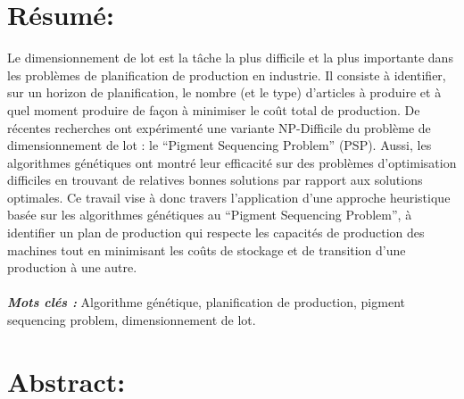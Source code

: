 \documentclass[12pt,a4paper]{article}
\begin{document}
	\newpage
	\tableofcontents
	
	\newpage
	
	\listoffigures
	
	\newpage
	
	\listoftables
	
	\newpage %
	
	\section*{Résumé:}
	
	\vspace{1cm}
	
	Le dimensionnement de lot est la tâche la plus difficile et la plus importante dans les problèmes de planification de production en industrie. Il consiste à identifier, sur un horizon de planification, le nombre (et le type) d’articles à produire et à quel moment produire de façon à minimiser le coût total de production. De récentes recherches ont expérimenté une variante NP-Difficile du problème de dimensionnement de lot : le “Pigment Sequencing Problem” (PSP). Aussi, les algorithmes génétiques ont montré leur efficacité sur des problèmes d’optimisation difficiles en trouvant de relatives bonnes solutions par rapport aux solutions optimales. Ce travail vise à donc travers l'application d'une approche heuristique basée sur les algorithmes génétiques au “Pigment Sequencing Problem”, à identifier un plan de production qui respecte les capacités de production des machines tout en minimisant les coûts de stockage et de transition d’une production à une autre. \\
	\\
	\hspace*{.5cm}\textsl{\textbf{Mots clés :}} Algorithme génétique, planification de production, pigment sequencing problem, dimensionnement de lot.
	
	\newpage %
	
	\section*{Abstract:}
	
	\vspace{1cm}
	
\end{document}
